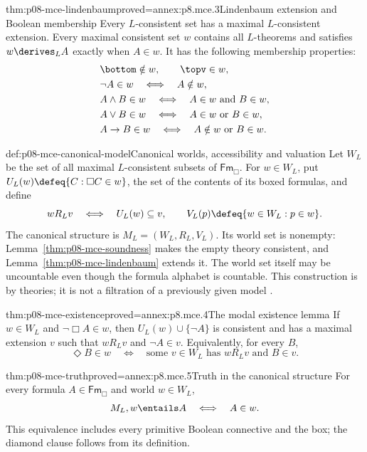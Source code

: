 \begin{hblemma}{thm:p08-mce-lindenbaum}{proved=annex:p8.mce.3}{Lindenbaum extension and Boolean membership}
Every \(L\)-consistent set has a maximal \(L\)-consistent extension.
Every maximal consistent set \(w\) contains all \(L\)-theorems and
satisfies \(w\derives_L A\) exactly when \(A\in w\). It has the
following membership properties:
\[
\begin{aligned}
 &\bottom\notin w,\qquad \topv\in w,\\
 &\neg A\in w\quad\Longleftrightarrow\quad A\notin w,\\
 &A\land B\in w\quad\Longleftrightarrow\quad A\in w\text{ and }B\in w,\\
 &A\lor B\in w\quad\Longleftrightarrow\quad A\in w\text{ or }B\in w,\\
 &A\to B\in w\quad\Longleftrightarrow\quad A\notin w\text{ or }B\in w.
\end{aligned}
\]
\end{hblemma}

\begin{hbdefinition}{def:p08-mce-canonical-model}{Canonical worlds, accessibility and valuation}
Let \(W_L\) be the set of all maximal \(L\)-consistent subsets of
\(\mathsf{Fm}_{\Box}\). For \(w\in W_L\), put
\(U_L(w)\defeq\{C:\Box C\in w\}\), the set of the contents of
its boxed formulas, and define
\[
 wR_Lv\quad\Longleftrightarrow\quad U_L(w)\subseteq v,
 \qquad V_L(p)\defeq\{w\in W_L:p\in w\}.
\]
The canonical structure is \(M_L=(W_L,R_L,V_L)\).
Its world set is nonempty: Lemma~\ref{thm:p08-mce-soundness} makes the
empty theory consistent, and Lemma~\ref{thm:p08-mce-lindenbaum} extends it.
The world set itself may be uncountable even though the formula alphabet
is countable. This construction is by theories; it is not a filtration
of a previously given model \cite[defs.~5.5 and 5.9]{Chellas1980}.
\end{hbdefinition}

\begin{hblemma}{thm:p08-mce-existence}{proved=annex:p8.mce.4}{The modal existence lemma}
If \(w\in W_L\) and \(\neg\Box A\in w\), then
\(U_L(w)\cup\{\neg A\}\) is consistent and has a maximal
extension \(v\) such that \(wR_Lv\) and \(\neg A\in v\).
Equivalently, for every \(B\),
\[
 \Diamond B\in w
 \quad\Longleftrightarrow\quad
 \text{some }v\in W_L\text{ has }wR_Lv\text{ and }B\in v.
\]
\end{hblemma}

\begin{hblemma}{thm:p08-mce-truth}{proved=annex:p8.mce.5}{Truth in the canonical structure}
For every formula \(A\in\mathsf{Fm}_{\Box}\) and world \(w\in W_L\),
\[
 M_L,w\entails A\quad\Longleftrightarrow\quad A\in w.
\]
This equivalence includes every primitive Boolean connective and the box;
the diamond clause follows from its definition.
\end{hblemma}

